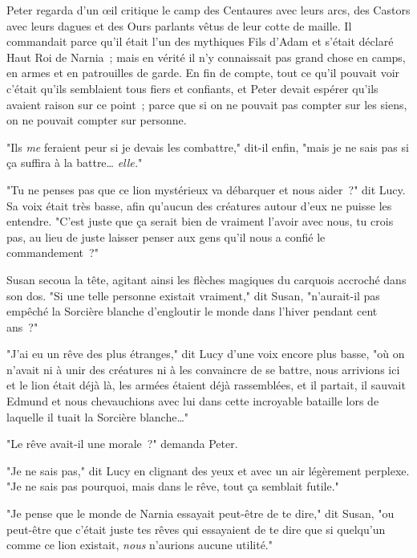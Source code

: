 Peter regarda d'un œil critique le camp des Centaures avec leurs arcs, des Castors avec leurs dagues et des Ours parlants vêtus de leur cotte de maille. Il commandait parce qu'il était l'un des mythiques Fils d'Adam et s'était déclaré Haut Roi de Narnia~; mais en vérité il n'y connaissait pas grand chose en camps, en armes et en patrouilles de garde. En fin de compte, tout ce qu'il pouvait voir c'était qu'ils semblaient tous fiers et confiants, et Peter devait espérer qu'ils avaient raison sur ce point~; parce que si on ne pouvait pas compter sur les siens, on ne pouvait compter sur personne.

"Ils \emph{me} feraient peur si je devais les combattre," dit-il enfin, "mais je ne sais pas si ça suffira à la battre… \emph{elle.}"

"Tu ne penses pas que ce lion mystérieux va débarquer et nous aider~?" dit Lucy. Sa voix était très basse, afin qu'aucun des créatures autour d'eux ne puisse les entendre. "C'est juste que ça serait bien de vraiment l'avoir avec nous, tu crois pas, au lieu de juste laisser penser aux gens qu'il nous a confié le commandement~?"

Susan secoua la tête, agitant ainsi les flèches magiques du carquois accroché dans son dos. "Si une telle personne existait vraiment," dit Susan, "n'aurait-il pas empêché la Sorcière blanche d'engloutir le monde dans l'hiver pendant cent ans~?"

"J'ai eu un rêve des plus étranges," dit Lucy d'une voix encore plus basse, "où on n'avait ni à unir des créatures ni à les convaincre de se battre, nous arrivions ici et le lion était déjà là, les armées étaient déjà rassemblées, et il partait, il sauvait Edmund et nous chevauchions avec lui dans cette incroyable bataille lors de laquelle il tuait la Sorcière blanche…"

"Le rêve avait-il une morale~?" demanda Peter.

"Je ne sais pas," dit Lucy en clignant des yeux et avec un air légèrement perplexe. "Je ne sais pas pourquoi, mais dans le rêve, tout ça semblait futile."

"Je pense que le monde de Narnia essayait peut-être de te dire," dit Susan, "ou peut-être que c'était juste tes rêves qui essayaient de te dire que si quelqu'un comme ce lion existait, \emph{nous} n'aurions aucune utilité."


